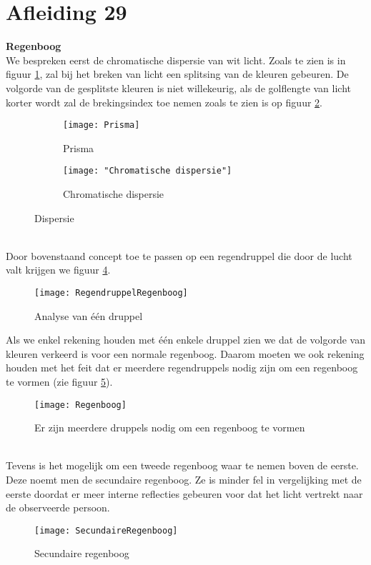 \documentclass[a4paper,kul]{kulakarticle} %
\begin{document}
\section{Afleiding 29}
\textbf{Regenboog}\\
We bespreken eerst de chromatische dispersie van wit licht. Zoals te zien is in figuur \ref{fig:prisma}, zal bij het breken van licht een splitsing van de kleuren gebeuren. De volgorde van de gesplitste kleuren is niet willekeurig, als de golflengte van licht korter wordt zal de brekingsindex toe nemen zoals te zien is op figuur \ref{fig:chromatische-dispersie}. 
\begin{figure}[!h]
	\centering
	\begin{subfigure}{.5\textwidth}
		\centering
		\texttt{[image: Prisma]}
		\caption[Prisma]{Prisma}
		\label{fig:prisma}
	\end{subfigure}%
	\begin{subfigure}{.5\textwidth}
		\centering
		\texttt{[image: "Chromatische dispersie"]}
		\caption[Chromatische dispersie]{Chromatische dispersie}
		\label{fig:chromatische-dispersie}
	\end{subfigure}
	\caption{Dispersie}
	\label{fig:ChromDisp}
\end{figure}\\
Door bovenstaand concept toe te passen op een regendruppel die door de lucht valt krijgen we figuur \ref{fig:regendruppelregenboog}.
\begin{figure}[!h]
	\centering
	\texttt{[image: RegendruppelRegenboog]}
	\caption[Regenboog druppel]{Analyse van één druppel}
	\label{fig:regendruppelregenboog}
\end{figure}
\newpage
Als we enkel rekening houden met één enkele druppel zien we dat de volgorde van kleuren verkeerd is voor een normale regenboog. Daarom moeten we ook rekening houden met het feit dat er meerdere regendruppels nodig zijn om een regenboog te vormen (zie figuur \ref{fig:regenboog}).
\begin{figure}[!h]
	\centering
	\texttt{[image: Regenboog]}
	\caption[Meerdere druppels]{Er zijn meerdere druppels nodig om een regenboog te vormen}
	\label{fig:regenboog}
\end{figure}\\
Tevens is het mogelijk om een tweede regenboog waar te nemen boven de eerste. Deze noemt men de secundaire regenboog. Ze is minder fel in vergelijking met de eerste doordat er meer interne reflecties gebeuren voor dat het licht vertrekt naar de observeerde persoon.
\begin{figure}[!h]
	\centering
	\texttt{[image: SecundaireRegenboog]}
	\caption[Secundaire regenboog]{Secundaire regenboog}
	\label{fig:secundaireregenboog}
\end{figure}
\end{document}
